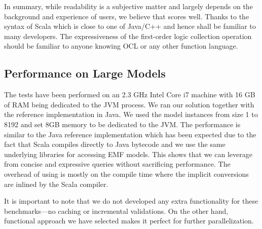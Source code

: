 In summary, while readability is a subjective matter and largely depends on the background and experience of users, we believe that \SIGMA scores well.
Thanks to the syntax of Scala which is close to one of Java/C++ and hence shall be familiar to many developers.
The expressiveness of the first-order logic collection operation should be familiar to anyone knowing OCL or any other function language.


\subsection{Performance on Large Models}

The tests have been performed on an 2.3 GHz Intel Core i7 machine with 16 GB of RAM being dedicated to the JVM process.
We ran our solution together with the reference implementation in Java.
We used the model instances from size 1 to 8192 and set 8GB memory to be dedicated to the JVM.
The performance is similar to the Java reference implementation which has been expected due to the fact that Scala compiles directly to Java bytecode and we use the same underlying libraries for accessing EMF models.
This shows that we can leverage from concise and expressive queries without sacrificing performance.
The overhead of using \SIGMA is mostly on the compile time where the implicit conversions are inlined by the Scala compiler.

It is important to note that we do not developed any extra functionality for these benchmarks---\Ie no caching or incremental validations.
On the other hand, functional approach we have selected makes it perfect for further parallelization.